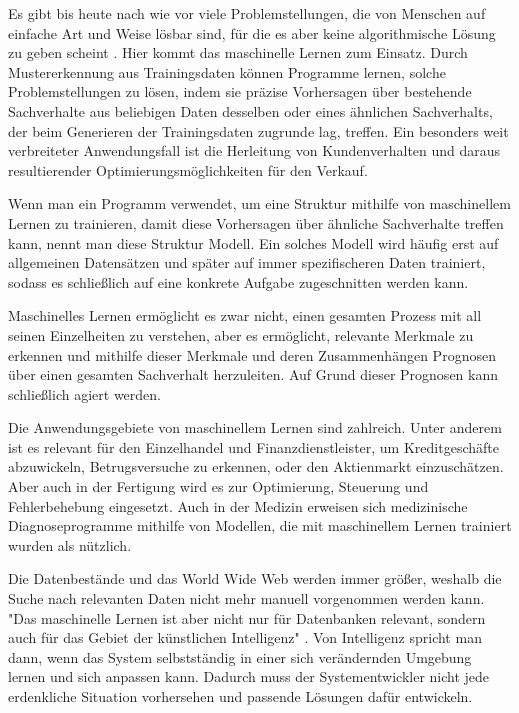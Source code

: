 Es gibt bis heute nach wie vor viele Problemstellungen, die von Menschen auf einfache Art und Weise lösbar sind, für die es aber keine algorithmische Lösung zu geben scheint \cite[S. 1]{alpaydin_maschinelles_2022}. Hier kommt das maschinelle Lernen zum Einsatz. Durch Mustererkennung aus Trainingsdaten können Programme lernen, solche Problemstellungen zu lösen, indem sie präzise Vorhersagen über bestehende Sachverhalte aus beliebigen Daten desselben oder eines ähnlichen Sachverhalts, der beim Generieren der Trainingsdaten zugrunde lag, treffen. Ein besonders weit verbreiteter Anwendungsfall ist die Herleitung von Kundenverhalten und daraus resultierender Optimierungsmöglichkeiten für den Verkauf. \cite[S. 1f]{alpaydin_maschinelles_2022}

Wenn man ein Programm verwendet, um eine Struktur mithilfe von maschinellem Lernen zu trainieren, damit diese Vorhersagen über ähnliche Sachverhalte treffen kann, nennt man diese Struktur Modell. Ein solches Modell wird häufig erst auf allgemeinen Datensätzen und später auf immer spezifischeren Daten trainiert, sodass es schließlich auf eine konkrete Aufgabe zugeschnitten werden kann. \cite[S. 1f]{alpaydin_maschinelles_2022}

Maschinelles Lernen ermöglicht es zwar nicht, einen gesamten Prozess mit all seinen Einzelheiten zu verstehen, aber es ermöglicht, relevante Merkmale zu erkennen und mithilfe dieser Merkmale und deren Zusammenhängen Prognosen über einen gesamten Sachverhalt herzuleiten. Auf Grund dieser Prognosen kann schließlich agiert werden. \cite[S. 2]{alpaydin_maschinelles_2022}

Die Anwendungsgebiete von maschinellem Lernen sind zahlreich. Unter anderem ist es relevant für den Einzelhandel und Finanzdienstleister, um Kreditgeschäfte abzuwickeln, Betrugsversuche zu erkennen, oder den Aktienmarkt einzuschätzen. Aber auch in der Fertigung wird es zur Optimierung, Steuerung und Fehlerbehebung eingesetzt. Auch in der Medizin erweisen sich medizinische Diagnoseprogramme mithilfe von Modellen, die mit maschinellem Lernen trainiert wurden als nützlich. \cite[S. 3]{alpaydin_maschinelles_2022}

Die Datenbestände und das World Wide Web werden immer größer, weshalb die Suche nach relevanten Daten nicht mehr manuell vorgenommen werden kann. "Das maschinelle Lernen ist aber nicht nur für Datenbanken relevant, sondern auch für das Gebiet der künstlichen Intelligenz" \cite[S. 3]{alpaydin_maschinelles_2022}. Von Intelligenz spricht man dann, wenn das System selbstständig in einer sich verändernden Umgebung lernen und sich anpassen kann. Dadurch muss der Systementwickler nicht jede erdenkliche Situation vorhersehen und passende Lösungen dafür entwickeln. \cite[S. 3]{alpaydin_maschinelles_2022}
 
